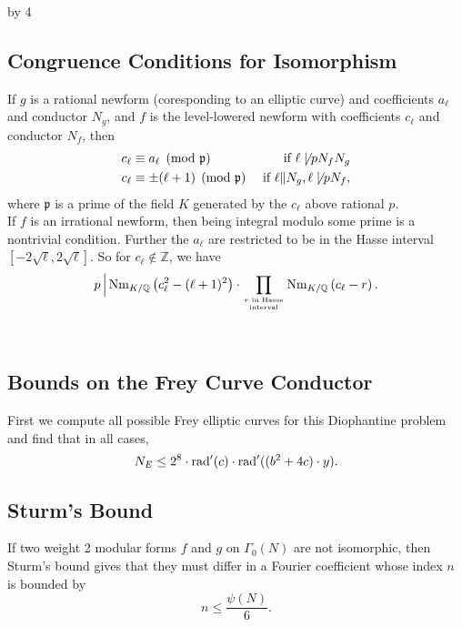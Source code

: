\documentclass[12pt]{scrartcl}
\def\Q{{\mathbb Q}}
\def\Z{{\mathbb Z}}
\newcommand{\rad}{{\rm{rad}}}
\newcommand{\p}{\mathfrak{p}}
\newcommand{\Nm}{\operatorname{Nm}}
\def\anzspalten{4}
\newlength{\kastenwidth}
\newenvironment{kasten}{%
  \begin{lrbox}{\dummybox}%
    \begin{minipage}{0.96\linewidth}}%
    {\end{minipage}%
  \end{lrbox}%
  \raisebox{-\depth}{\psshadowbox[framesep=1em]{\usebox{\dummybox}}}\\[0.5em]}
\newenvironment{spalte}{%
  \setlength\kastenwidth{1.2\textwidth}
  \divide\kastenwidth by \anzspalten
  \begin{minipage}[t]{\kastenwidth}}{\end{minipage}\hfill}
\begin{document}
\begin{lrbox}{\spalten}
{\begin{spalte}
\begin{kasten}

\subsection*{ \color{blue} Congruence Conditions for Isomorphism}

If $g$ is a rational newform (coresponding to an elliptic curve) and coefficients $a_\ell$ and conductor $N_g$, and $f$ is the level-lowered newform with coefficients $c_\ell$ and conductor $N_f$, then
\begin{align*}
c_\ell &\equiv a_\ell \pmod{\p} & \text{ if $\ell \not\mid pN_fN_g$} \\
c_\ell &\equiv \pm(\ell+1) \pmod{\p} & \text{ if $\ell \| N_g, \ell \not\mid pN_f$},
\end{align*}
where $\p$ is a prime of the field $K$ generated by the $c_\ell$ above rational $p$. \\

If $f$ is an irrational newform, then being integral modulo some prime is a nontrivial condition.  Further the $a_\ell$ are restricted to be in the Hasse interval $[-2\sqrt{\ell}, 2\sqrt{\ell}]$.  So for $c_\ell \not\in \Z$, we have
\[ p\, \Big| \Nm_{K/\Q}\left(c_\ell^2 - (\ell+1)^2\right) \cdot \prod_{r \text{ in Hasse} \atop \text{interval}} \Nm_{K/\Q} \left( c_\ell - r \right). \]


\end{kasten}

\begin{kasten}

\subsection*{\color{blue} Bounds on the Frey Curve Conductor}

First we compute all possible Frey elliptic curves for this Diophantine problem and find that in all cases,
\[N_E \leq 2^8 \cdot \rad'(c) \cdot \rad'((b^2+4c)\cdot y).\]


\subsection*{\color{blue} Sturm's Bound}

If two weight 2 modular forms $f$ and $g$ on $\Gamma_0(N)$ are not isomorphic, then Sturm's bound gives that they must differ in a Fourier coefficient whose index $n$ is bounded by 
\[n \leq \frac{\psi(N)}{6}.\] 


\end{kasten}
\end{spalte}}
\end{lrbox}
\end{document}
